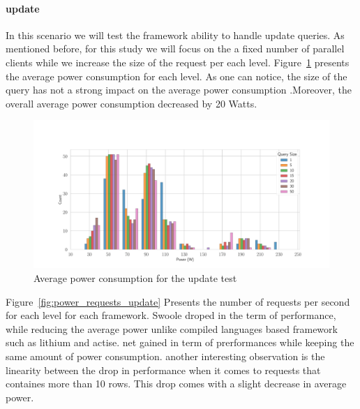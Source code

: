 \paragraph{update}
In this scenario we will test the framework ability to handle update queries. As mentioned before,  for this study we will focus on the a fixed number of parallel clients while we increase the size of the request per each level.
Figure~\ref{fig:av_power_update} presents the average power consumption for each level. As one can notice, the size of the query has not a strong impact on the average power consumption .Moreover, the overall average power consumption decreased by 20 Watts.
\begin{figure}[hbt]
    \centering
    \includegraphics[width=
        \columnwidth]{imgs/histogram_av_power_cpu_update}
    \caption{Average power consumption for the update test }
    \label{fig:av_power_update}
\end{figure}
Figure~\ref{fig:power_requests_update} Presents the number of requests per second for each level for each framework. Swoole droped in the term of performance, while reducing the average power unlike compiled languages based framework such as lithium and actise. net gained in term of prerformances while keeping the same amount of power consumption. another interesting observation is the linearity between the drop in performance when it comes to requests that containes more than 10 rows. This drop comes with a slight decrease in average power.

